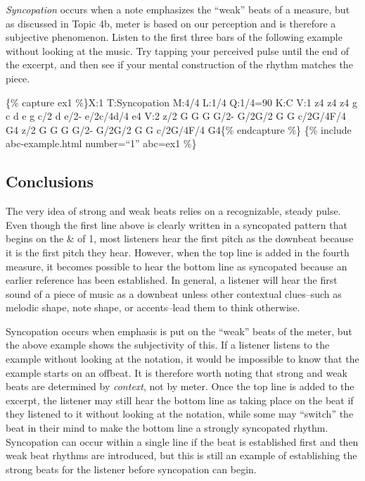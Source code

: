 \documentclass{book}
\begin{document}
\emph{Syncopation} occurs when a note emphasizes the ``weak'' beats of a
measure, but as discussed in Topic 4b, meter is based on our perception and is
therefore a subjective phenomenon. Listen to the first three bars of the
following example without looking at the music. Try tapping your perceived
pulse until the end of the excerpt, and then see if your mental construction
of the rhythm matches the piece.

\{\% capture ex1 \%\}X:1 T:Syncopation M:4/4 L:1/4 Q:1/4=90 K:C V:1
z4\textbar{} z4\textbar{} z4\textbar\textbar{} g c d e\textbar{} g c/2 d e/2-
e/2c/4d/4\textbar{} e4\textbar{]} V:2 z/2 G G G G/2-\textbar{} G/2G/2 G G
c/2G/4F/4\textbar{} G4\textbar\textbar{} z/2 G G G G/2-\textbar{} G/2G/2 G G
c/2G/4F/4\textbar{} G4\textbar{]}\{\% endcapture \%\} \{\% include
abc-example.html number=``1'' abc=ex1 \%\}

\hypertarget{conclusions-61}{%
\subsection{Conclusions}\label{conclusions-61}}

The very idea of strong and weak beats relies on a recognizable, steady pulse.
Even though the first line above is clearly written in a syncopated pattern
that begins on the \& of 1, most listeners hear the first pitch as the
downbeat because it is the first pitch they hear. However, when the top line
is added in the fourth measure, it becomes possible to hear the bottom line as
syncopated because an earlier reference has been established. In general, a
listener will hear the first sound of a piece of music as a downbeat unless
other contextual clues--such as melodic shape, note shape, or accents--lead
them to think otherwise.

Syncopation occurs when emphasis is put on the ``weak'' beats of the meter,
but the above example shows the subjectivity of this. If a listener listens to
the example without looking at the notation, it would be impossible to know
that the example starts on an offbeat. It is therefore worth noting that
strong and weak beats are determined by \emph{context}, not by meter. Once the
top line is added to the excerpt, the listener may still hear the bottom line
as taking place on the beat if they listened to it without looking at the
notation, while some may ``switch'' the beat in their mind to make the bottom
line a strongly syncopated rhythm. Syncopation can occur within a single line
if the beat is established first and then weak beat rhythms are introduced,
but this is still an example of establishing the strong beats for the listener
before syncopation can begin.
\end{document}
